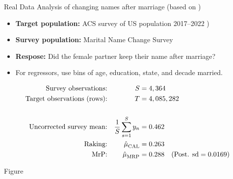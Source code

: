 \begin{frame}{Real Data}
Analysis of changing names after marriage (based on \citet{alexander:2019:namechange})

\begin{itemize}
    \item \textbf{Target population:} ACS survey of US population 2017--2022 \citep{ipumsusa})
    \item \textbf{Survey population:} Marital Name Change Survey \citep{cohen:2019:namechange}
    \item \textbf{Respose:}  Did the female partner keep their name after marriage?
    \item For regressors, use bins of age, education, state, and decade married.
\end{itemize}

$$
\begin{aligned}
    \textrm{Survey observations:} &&  S ={}& 4,364  \\
    \textrm{Target observations (rows):} &&  T ={}& 4,085,282 \\
    \\
    \textrm{Uncorrected survey mean:} && \frac{1}{S} \sum_{s=1}^S y_n ={}& 0.462 \\
    \textrm{Raking:} && \hat{\mu}^{}_{\mathrm{CAL}} ={}& 0.263 \\
    \textrm{MrP:} && \hat{\mu}^{}_{\mathrm{MRP}} ={}& 0.288
        \quad(\textrm{Post. sd} = 0.0169)\\
\end{aligned}
$$
%
\end{frame}


\begin{frame}{Figure}
\AlexanderBandFig{}
\end{frame}
